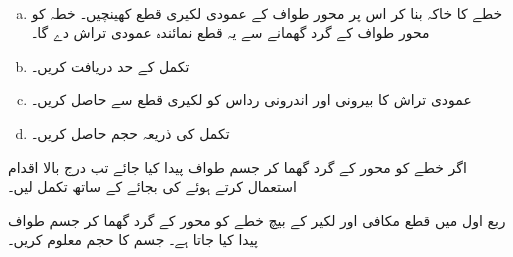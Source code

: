 \\
\begin{enumerate}[a.]
\item
خطے کا خاکہ بنا کر اس پر محور طواف کے عمودی لکیری قطع کھینچیں۔ خطہ کو محور طواف کے گرد گھمانے سے یہ قطع نمائندہ عمودی تراش دے گا۔
\item
تکمل کے حد دریافت کریں۔
\item
عمودی تراش کا بیرونی اور اندرونی رداس کو لکیری قطع سے حاصل کریں۔
\item
تکمل کی ذریعہ حجم حاصل کریں۔
\end{enumerate}

اگر خطے کو  محور کے گرد گھما کر جسم طواف پیدا کیا جائے تب درج بالا اقدام استعمال کرتے ہوئے  کی بجائے  کے ساتھ تکمل لیں۔

ربع اول میں قطع مکافی  اور لکیر   کے بیچ خطے کو   محور کے گرد گھما کر جسم طواف پیدا کیا جاتا ہے۔ جسم کا حجم معلوم کریں۔

